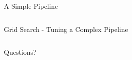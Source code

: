 \documentclass{lug}
\begin{document}
\begin{frame}{A Simple Pipeline}
  \inputminted[fontsize=\scriptsize]{python3}{examples/pipeline.py}
\end{frame}

\begin{frame}{Grid Search - Tuning a Complex Pipeline}
  \inputminted[fontsize=\scriptsize]{python3}{examples/gridsearch_pipeline.py}
\end{frame}

\begin{frame}[standout]
    \Huge
    Questions?
\end{frame}
\end{document}
